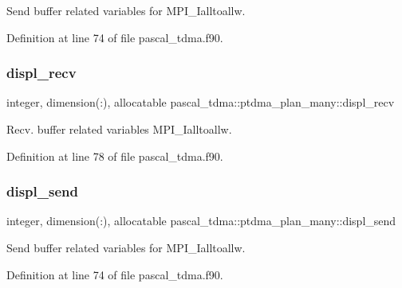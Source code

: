 Send buffer related variables for M\+P\+I\+\_\+\+Ialltoallw. 



Definition at line 74 of file pascal\+\_\+tdma.\+f90.

\mbox{\label{structpascal__tdma_1_1ptdma__plan__many_a1801ea6bbff319dd594a5e993bc5d542}} 
\subsubsection{\texorpdfstring{displ\_recv}{displ\_recv}}
{\footnotesize\ttfamily integer, dimension(\+:), allocatable pascal\+\_\+tdma\+::ptdma\+\_\+plan\+\_\+many\+::displ\+\_\+recv}



Recv. buffer related variables M\+P\+I\+\_\+\+Ialltoallw. 



Definition at line 78 of file pascal\+\_\+tdma.\+f90.

\mbox{\label{structpascal__tdma_1_1ptdma__plan__many_a1c7544758e7ccfcd3b07e91caf0d8f3d}} 
\subsubsection{\texorpdfstring{displ\_send}{displ\_send}}
{\footnotesize\ttfamily integer, dimension(\+:), allocatable pascal\+\_\+tdma\+::ptdma\+\_\+plan\+\_\+many\+::displ\+\_\+send}



Send buffer related variables for M\+P\+I\+\_\+\+Ialltoallw. 



Definition at line 74 of file pascal\+\_\+tdma.\+f90.

\mbox{\label{structpascal__tdma_1_1ptdma__plan__many_ad94248e2aa0653f151f0575d62d6fff7}} 
